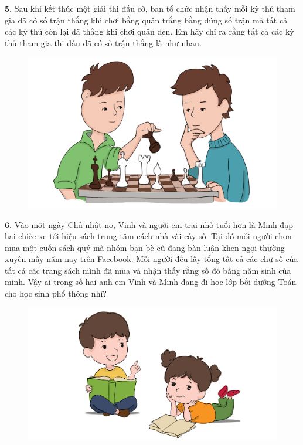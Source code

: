\begin{multicols}{2}
\begin{figure}[H]
		\vspace*{-20pt}
	\end{figure}
	$\pmb{5.}$ 	Sau khi kết thúc một giải thi đấu cờ, ban tổ chức nhận thấy mỗi kỳ thủ tham gia đã có số trận thắng khi chơi bằng quân trắng bằng đúng số trận mà tất cả các kỳ thủ còn lại đã thắng khi chơi quân đen. Em hãy chỉ ra rằng tất cả các kỳ thủ tham gia thi đấu đã có số trận thắng là như nhau.
	\begin{figure}[H]
		\centering
		\vspace*{2pt}
		\captionsetup{labelformat= empty, justification=centering}
		\includegraphics[width=0.8\linewidth]{Pi1_2_Bai5}
		\vspace*{-10pt}
	\end{figure}
	$\pmb{6.}$ Vào một ngày Chủ nhật nọ, Vinh và người em trai nhỏ tuổi hơn là Minh  đạp hai chiếc xe tới hiệu sách trung tâm cách nhà vài cây số. Tại đó mỗi người chọn mua một cuốn sách quý mà nhóm bạn bè cũ đang bàn luận khen ngợi thường xuyên mấy năm nay trên Facebook. Mỗi người đều lấy tổng tất cả các chữ số của tất cả các trang sách mình đã mua và nhận thấy rằng số đó bẳng năm sinh của mình. Vậy ai  trong số hai anh em Vinh và Minh  đang đi học lớp  bồi dưỡng Toán cho học sinh phổ thông nhỉ?
	\begin{figure}[H]
		\centering
		\vspace*{-10pt}
		\captionsetup{labelformat= empty, justification=centering}
		\includegraphics[width=1\linewidth]{Pi1_2_Bai6}
		\vspace*{-15pt}
	\end{figure}
\end{multicols}
